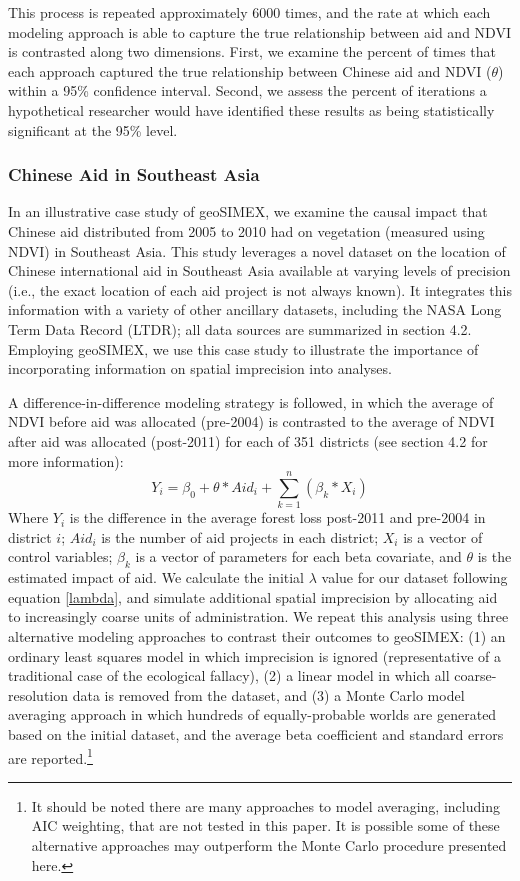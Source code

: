 This process is repeated approximately 6000 times, and the rate at which each modeling approach is able to capture the true relationship between aid and NDVI is contrasted along two dimensions.  First, we examine the percent of times that each approach captured the true relationship between Chinese aid and NDVI ($\theta$) within a 95\% confidence interval.  Second, we assess the percent of iterations a hypothetical researcher would have identified these results as being statistically significant at the 95\% level.

\subsubsection{Chinese Aid in Southeast Asia}
In an illustrative case study of geoSIMEX, we examine the causal impact that Chinese aid distributed from 2005 to 2010 had on vegetation (measured using NDVI) in Southeast Asia.  
This study leverages a novel dataset on the location of Chinese international aid in Southeast Asia available at varying levels of precision (i.e., the exact location of each aid project is not always known).  
It integrates this information with a variety of other ancillary datasets, including the NASA Long Term Data Record (LTDR); all data sources are summarized in section 4.2.  
Employing geoSIMEX, we use this case study to illustrate the importance of incorporating information on spatial imprecision into analyses.
\par
A difference-in-difference modeling strategy is followed, in which the average of NDVI before aid was allocated (pre-2004) is contrasted to the average of NDVI after aid was allocated (post-2011) for each of 351 districts (see section 4.2 for more information):
\begin{equation}\label{eq:caseStudy}
Y_{i} = \beta_0 + \theta * Aid_{i} + \sum_{k=1}^{n}(\beta_{k} * X_{i})
\end{equation}
Where $Y_{i}$ is the difference in the average forest loss post-2011 and pre-2004 in district $i$; $Aid_{i}$ is the number of aid projects in each district; $X_{i}$ is a vector of control variables; $\beta_{k}$ is a vector of parameters for each beta covariate, and $\theta$ is the estimated impact of aid.
We calculate the initial $\lambda$ value for our dataset following equation \ref{lambda}, and simulate additional spatial imprecision by allocating aid to increasingly coarse units of administration.  
We repeat this analysis using three alternative modeling approaches to contrast their outcomes to geoSIMEX: (1) an ordinary least squares model in which imprecision is ignored (representative of a traditional case of the ecological fallacy), (2) a linear model in which all coarse-resolution data is removed from the dataset, and (3) a Monte Carlo model averaging approach in which hundreds of equally-probable worlds are generated based on the initial dataset, and the average beta coefficient and standard errors are reported.\footnote{It should be noted there are many approaches to model averaging, including AIC weighting, that are not tested in this paper. It is possible some of these alternative approaches may outperform the Monte Carlo procedure presented here.}



